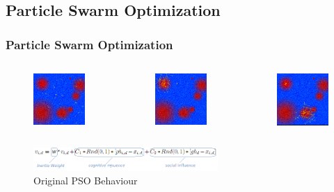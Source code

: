 \documentclass{beamer}
\begin{document}
\subsection{Particle Swarm Optimization}
\begin{frame}
\frametitle{Particle Swarm Optimization}

\begin{columns}[c]


\begin{figure}
\centering
\includegraphics[width=35mm ]{funcStart.png}
\end{figure}

\begin{figure}
\centering
\includegraphics[width=35mm ]{funcFound.png}
\end{figure}

\begin{figure}
\centering
\includegraphics[width=35mm]{funcNotFound.png}
\end{figure}
\end{columns}

\begin{figure}
\centering
\includegraphics[width=70mm ]{psoEq.png}
\caption{Original PSO Behaviour}
\label{pso}
\end{figure}

\end{frame}
\end{document}
